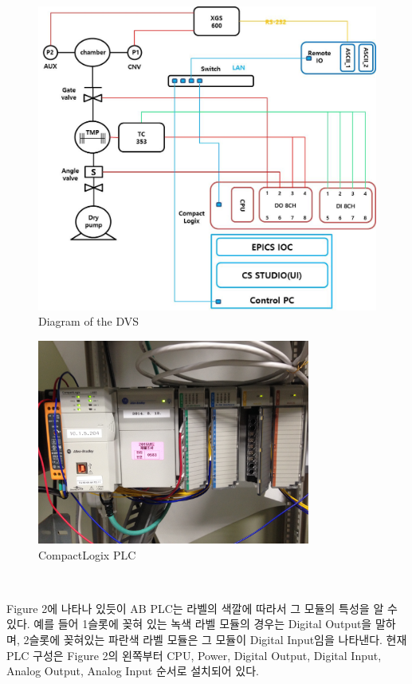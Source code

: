 \documentclass[11pt
  , a4paper
  , article
  , oneside
]{memoir}
\begin{document}
\begin{figure}[!htb]
  \centering
  \includegraphics[width=1 \textwidth]{./picture/configuration_diagram.jpg}
  \caption{
             Diagram of the DVS
          }
  \label{fig:}
\end{figure}

\newpage

\begin{figure}[!htb]
	\centering
	\includegraphics[width=0.8\textwidth]{./picture/compact.JPG}
	\caption{
		CompactLogix PLC 
	}
	\label{fig:}
\end{figure}\

Figure 2에 나타나 있듯이 AB PLC는 라벨의 색깔에 따라서 그 모듈의 특성을 알 수 있다. 예를 들어 1슬롯에 꽂혀 있는 녹색 라벨 모듈의 경우는 Digital Output을 말하며, 2슬롯에 꽂혀있는 파란색 라벨 모듈은 그 모듈이 Digital Input임을 나타낸다. 현재 PLC 구성은 Figure 2의 왼쪽부터 CPU, Power, Digital Output, Digital Input, Analog Output, Analog Input 순서로 설치되어 있다.
\end{document}

